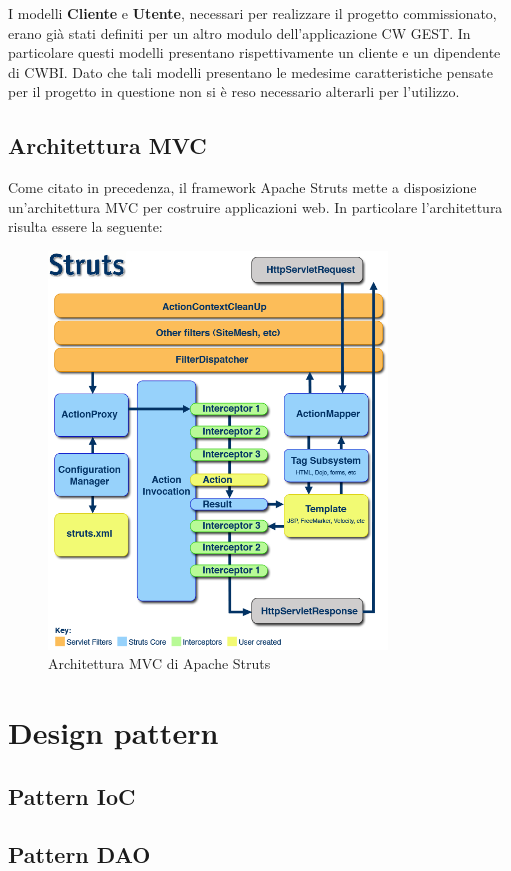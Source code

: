 \setlength{\parskip}{6ex}

\noindent I modelli \textbf{Cliente} e \textbf{Utente}, necessari per realizzare il progetto commissionato, erano già stati definiti per un altro modulo dell'applicazione CW GEST. In particolare questi modelli presentano rispettivamente un cliente e un dipendente di CWBI. Dato che tali modelli presentano le medesime caratteristiche pensate per il progetto in questione non si è reso necessario alterarli per l'utilizzo.

\pagebreak

\subsection{Architettura MVC}
Come citato in precedenza, il framework Apache Struts mette a disposizione un'architettura MVC per costruire applicazioni web. In particolare l'architettura risulta essere la seguente:

\begin{figure}[!h]
	\centering
	\includegraphics[width=9cm]{../images/MVC.png}
	\caption{Architettura MVC di Apache Struts}
\end{figure}

\section{Design pattern}
\subsection{Pattern IoC}


\subsection{Pattern DAO}
